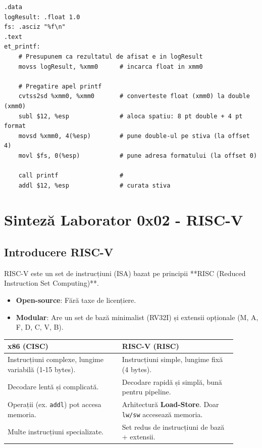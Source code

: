 \documentclass[12pt,a4paper]{article}
\begin{document}
\begin{lstlisting}[language=x86asm]
.data
logResult: .float 1.0
fs: .asciz "%f\n"
.text
et_printf:
    # Presupunem ca rezultatul de afisat e in logResult
    movss logResult, %xmm0      # incarca float in xmm0
    
    # Pregatire apel printf
    cvtss2sd %xmm0, %xmm0       # converteste float (xmm0) la double (xmm0)
    subl $12, %esp              # aloca spatiu: 8 pt double + 4 pt format
    movsd %xmm0, 4(%esp)        # pune double-ul pe stiva (la offset 4)
    movl $fs, 0(%esp)           # pune adresa formatului (la offset 0)
    
    call printf                 #
    addl $12, %esp              # curata stiva
\end{lstlisting}

\newpage
\section{Sinteză Laborator 0x02 - RISC-V}

\subsection{Introducere RISC-V}
RISC-V este un set de instrucțiuni (ISA) bazat pe principii **RISC (Reduced Instruction Set Computing)**.
\begin{itemize}
    \item \textbf{Open-source}: Fără taxe de licențiere.
    \item \textbf{Modular}: Are un set de bază minimalist (RV32I) și extensii opționale (M, A, F, D, C, V, B).
\end{itemize}

\begin{table}[ht!]
\centering
\begin{tabular}{p{0.45\linewidth} | p{0.45\linewidth}}
\toprule
\textbf{x86 (CISC)} & \textbf{RISC-V (RISC)} \\
\midrule
Instrucțiuni complexe, lungime variabilă (1-15 bytes). & Instrucțiuni simple, lungime fixă (4 bytes). \\
\hline
Decodare lentă și complicată. & Decodare rapidă și simplă, bună pentru pipeline. \\
\hline
Operații (ex. \texttt{addl}) pot accesa memoria. & Arhitectură \textbf{Load-Store}. Doar \texttt{lw/sw} accesează memoria. \\
\hline
Multe instrucțiuni specializate. & Set redus de instrucțiuni de bază + extensii. \\
\bottomrule
\end{tabular}
\end{table}
\end{document}
